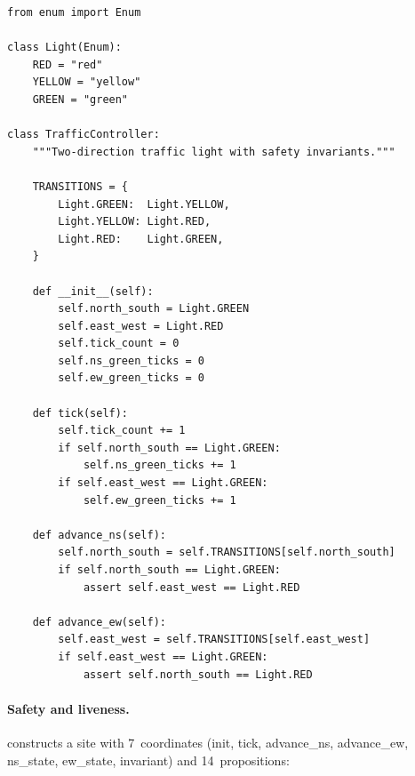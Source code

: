 \begin{lstlisting}[style=jugeo-python,caption={Traffic light controller.},label={lst:traffic}]
from enum import Enum

class Light(Enum):
    RED = "red"
    YELLOW = "yellow"
    GREEN = "green"

class TrafficController:
    """Two-direction traffic light with safety invariants."""

    TRANSITIONS = {
        Light.GREEN:  Light.YELLOW,
        Light.YELLOW: Light.RED,
        Light.RED:    Light.GREEN,
    }

    def __init__(self):
        self.north_south = Light.GREEN
        self.east_west = Light.RED
        self.tick_count = 0
        self.ns_green_ticks = 0
        self.ew_green_ticks = 0

    def tick(self):
        self.tick_count += 1
        if self.north_south == Light.GREEN:
            self.ns_green_ticks += 1
        if self.east_west == Light.GREEN:
            self.ew_green_ticks += 1

    def advance_ns(self):
        self.north_south = self.TRANSITIONS[self.north_south]
        if self.north_south == Light.GREEN:
            assert self.east_west == Light.RED

    def advance_ew(self):
        self.east_west = self.TRANSITIONS[self.east_west]
        if self.east_west == Light.GREEN:
            assert self.north_south == Light.RED
\end{lstlisting}

\paragraph{Safety and liveness.}
\JuGeo{} constructs a site with 7~coordinates (init, tick,
advance\_ns, advance\_ew, ns\_state, ew\_state, invariant) and
14~propositions:

